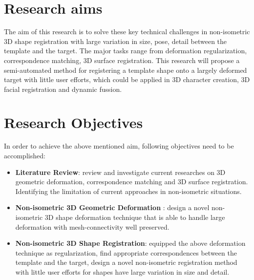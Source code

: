 \section{Research aims}
The aim of this research is to solve these key technical challenges in non-isometric 3D shape registration with large variation in size, pose, detail between the template and the target. The major tasks range from deformation regularization, correspondence matching, 3D surface registration. This research will propose a semi-automated method for registering a template shape onto a largely deformed target with little user efforts, which could be applied in 3D character creation, 3D facial registration and dynamic fussion.
\section{Research Objectives}
In order to achieve the above mentioned aim, following objectives need to be accomplished:
\begin{itemize}
\item \textbf{Literature Review}: review and investigate current researches on 3D geometric deformation, correspondence matching and 3D surface registration. Identifying the limitation of current approaches in non-isometric situations.
\item \textbf{Non-isometric 3D Geometric Deformation }: design a novel non-isometric 3D shape deformation technique that is able to handle large deformation with mesh-connectivity well preserved.
\item \textbf{Non-isometric 3D Shape Registration}: equipped the above deformation technique as regularization, find appropriate correspondences between the template and the target, design a novel non-isometric registration method with little user efforts for shapes have large variation in size and detail.

\end{itemize}

